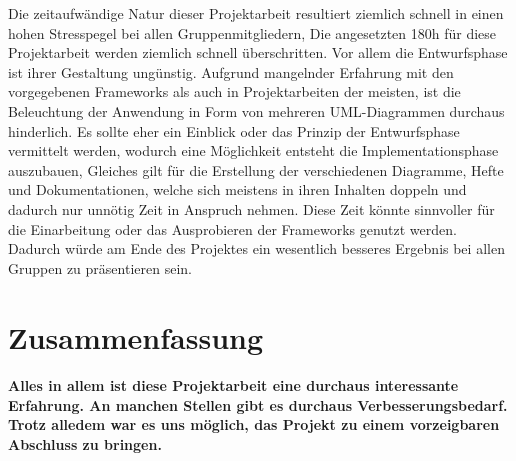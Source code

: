 \documentclass[a4paper]{article}
\begin{document}
{Die zeitaufwändige Natur dieser Projektarbeit resultiert ziemlich schnell in einen hohen Stresspegel bei allen Gruppenmitgliedern, Die angesetzten 180h für diese Projektarbeit werden ziemlich schnell überschritten. Vor allem die Entwurfsphase ist ihrer Gestaltung ungünstig. Aufgrund mangelnder Erfahrung mit den vorgegebenen Frameworks als auch in Projektarbeiten der meisten, ist die Beleuchtung der Anwendung in Form von mehreren UML-Diagrammen durchaus hinderlich. Es sollte eher ein Einblick oder das Prinzip der Entwurfsphase vermittelt werden, wodurch eine Möglichkeit entsteht die Implementationsphase auszubauen, Gleiches gilt für die Erstellung der verschiedenen Diagramme, Hefte und Dokumentationen, welche sich meistens in ihren Inhalten doppeln und dadurch nur unnötig Zeit in Anspruch nehmen. Diese Zeit könnte sinnvoller für die Einarbeitung oder das Ausprobieren der Frameworks genutzt werden. Dadurch würde am Ende des Projektes ein wesentlich besseres Ergebnis bei allen Gruppen zu präsentieren sein.}

\section{Zusammenfassung}

\paragraph{Alles in allem ist diese Projektarbeit eine durchaus interessante Erfahrung. An manchen Stellen gibt es durchaus Verbesserungsbedarf. Trotz alledem war es uns möglich, das Projekt zu einem vorzeigbaren Abschluss zu bringen.}
\end{document}
